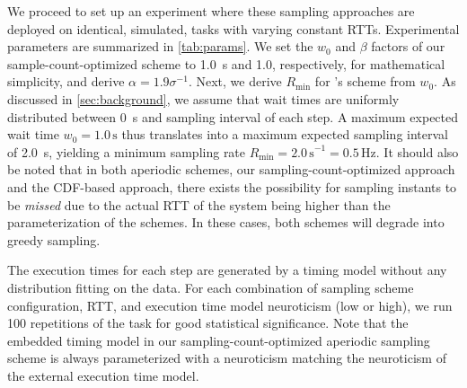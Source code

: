 We proceed to set up an experiment where these sampling approaches are deployed on identical, simulated, tasks with varying constant \acp{RTT}.
Experimental parameters are summarized in \cref{tab:params}.
We set the \( w_0 \) and \( \beta \) factors of our sample-count-optimized scheme to \SI{1.0}{\second} and \num{1.0}, respectively, for mathematical simplicity, and derive \( \alpha = 1.9 \sigma^{-1} \).
Next, we derive \( R_\text{min} \) for \textcite{Wang2019Towards}'s scheme from \( w_0 \).
As discussed in \cref{sec:background}, we assume that wait times are uniformly distributed between \SI{0}{\second} and sampling interval of each step.
A maximum expected wait time \( w_0 = 1.0\,\si{\second} \) thus translates into a maximum expected sampling interval of \SI{2.0}{\second}, yielding a minimum sampling rate \( R_\text{min} = {2.0\,\si{\second}}^{-1} = 0.5\,\si{\hertz} \).
It should also be noted that in both aperiodic schemes, our sampling-count-optimized approach and the \ac{CDF}-based approach, there exists the possibility for sampling instants to be \emph{missed} due to the actual \ac{RTT} of the system being higher than the parameterization of the schemes.
In these cases, both schemes will degrade into greedy sampling.

The execution times for each step are generated by a timing model without any distribution fitting on the data.
For each combination of sampling scheme configuration, \ac{RTT}, and execution time model neuroticism (low or high), we run \num{100} repetitions of the task for good statistical significance.
Note that the embedded timing model in our sampling-count-optimized aperiodic sampling scheme is always parameterized with a neuroticism matching the neuroticism of the external execution time model.

